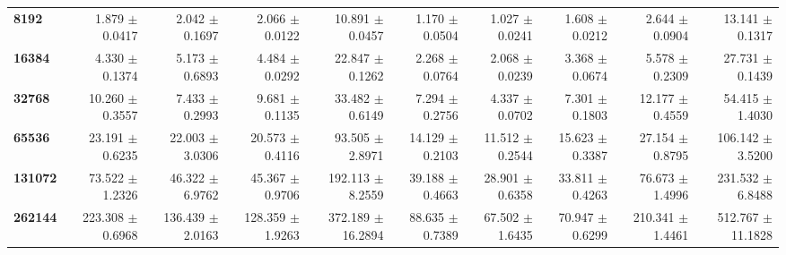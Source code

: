 \begin{tabular}{lrrrrrrrrr}
\textbf{8192}  & 1.879 $\pm$ 0.0417 & 2.042 $\pm$ 0.1697 & 2.066 $\pm$ 0.0122 & 10.891 $\pm$ 0.0457 & 1.170 $\pm$ 0.0504 & 1.027 $\pm$ 0.0241 & 1.608 $\pm$ 0.0212 & 2.644 $\pm$ 0.0904 & 13.141 $\pm$ 0.1317\\
\textbf{16384}  & 4.330 $\pm$ 0.1374 & 5.173 $\pm$ 0.6893 & 4.484 $\pm$ 0.0292 & 22.847 $\pm$ 0.1262 & 2.268 $\pm$ 0.0764 & 2.068 $\pm$ 0.0239 & 3.368 $\pm$ 0.0674 & 5.578 $\pm$ 0.2309 & 27.731 $\pm$ 0.1439\\
\textbf{32768}  & 10.260 $\pm$ 0.3557 & 7.433 $\pm$ 0.2993 & 9.681 $\pm$ 0.1135 & 33.482 $\pm$ 0.6149 & 7.294 $\pm$ 0.2756 & 4.337 $\pm$ 0.0702 & 7.301 $\pm$ 0.1803 & 12.177 $\pm$ 0.4559 & 54.415 $\pm$ 1.4030\\
\textbf{65536}  & 23.191 $\pm$ 0.6235 & 22.003 $\pm$ 3.0306 & 20.573 $\pm$ 0.4116 & 93.505 $\pm$ 2.8971 & 14.129 $\pm$ 0.2103 & 11.512 $\pm$ 0.2544 & 15.623 $\pm$ 0.3387 & 27.154 $\pm$ 0.8795 & 106.142 $\pm$ 3.5200\\
\textbf{131072}  & 73.522 $\pm$ 1.2326 & 46.322 $\pm$ 6.9762 & 45.367 $\pm$ 0.9706 & 192.113 $\pm$ 8.2559 & 39.188 $\pm$ 0.4663 & 28.901 $\pm$ 0.6358 & 33.811 $\pm$ 0.4263 & 76.673 $\pm$ 1.4996 & 231.532 $\pm$ 6.8488\\
\textbf{262144} & 223.308 $\pm$ 0.6968 & 136.439 $\pm$ 2.0163 & 128.359 $\pm$ 1.9263 & 372.189 $\pm$ 16.2894 & 88.635 $\pm$ 0.7389 & 67.502 $\pm$ 1.6435 & 70.947 $\pm$ 0.6299 & 210.341 $\pm$ 1.4461 & 512.767 $\pm$ 11.1828\\
\bottomrule
\end{tabular}
